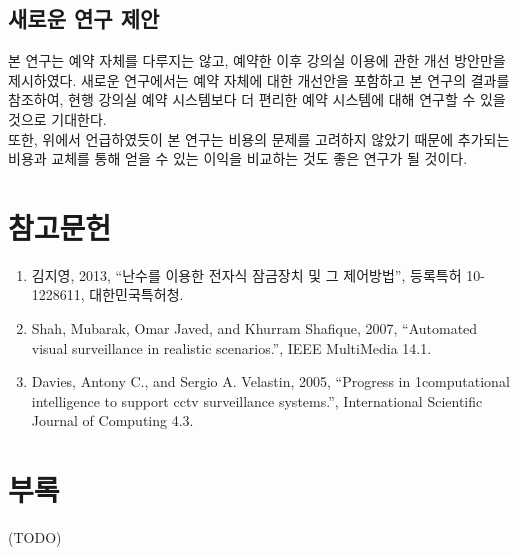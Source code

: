 \documentclass[11pt,a4paper]{article}
\begin{document}
\subsection{새로운 연구 제안}
본 연구는 예약 자체를 다루지는 않고, 예약한 이후 강의실 이용에 관한 개선 방안만을 제시하였다. 새로운 연구에서는 예약 자체에 대한 개선안을 포함하고 본 연구의 결과를 참조하여, 현행 강의실 예약 시스템보다 더 편리한 예약 시스템에 대해 연구할 수 있을 것으로 기대한다.\\
또한, 위에서 언급하였듯이 본 연구는 비용의 문제를 고려하지 않았기 때문에 추가되는 비용과 교체를 통해 얻을 수 있는 이익을 비교하는 것도 좋은 연구가 될 것이다.

\section{참고문헌}
\begin{enumerate}
\item 김지영, 2013, “난수를 이용한 전자식 잠금장치 및 그 제어방법”, 등록특허 10-1228611, 대한민국특허청.
\item Shah, Mubarak, Omar Javed, and Khurram Shafique, 2007, “Automated visual surveillance in realistic scenarios.”, IEEE MultiMedia 14.1.
\item Davies, Antony C., and Sergio A. Velastin, 2005, “Progress in 1computational intelligence to support cctv surveillance systems.”, International Scientific Journal of Computing 4.3.
\end{enumerate}

\section{부록}
(TODO)
\end{document}
